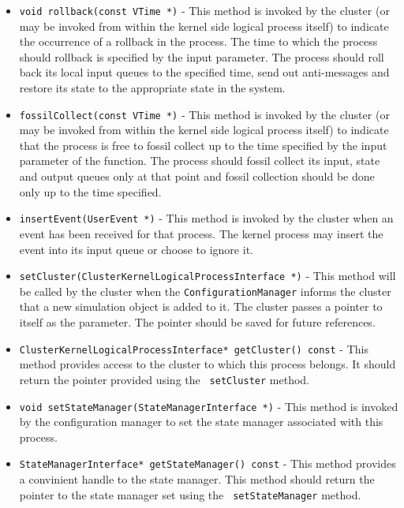 \begin{itemize}
\item {\tt void rollback(const VTime *)} - This method is invoked by the
  cluster (or may be invoked from within the kernel side logical process
  itself) to indicate the occurrence of a rollback in the process. The
  time to which the process should rollback is specified by the input
  parameter. The process should roll back its local input queues to the
  specified time, send out anti-messages and restore its state to the
  appropriate state in the system.
  
\item {\tt fossilCollect(const VTime *)} - This method is invoked by the
  cluster (or may be invoked from within the kernel side logical process
  itself) to indicate that the process is free to fossil collect up to the
  time specified by the input parameter of the function. The process
  should fossil collect its input, state and output queues only at that
  point and fossil collection should be done only up to the time
  specified.

\item {\tt insertEvent(UserEvent *)} - This method is invoked by the
  cluster when an event has been received for that process. The kernel
  process may insert the event into its input queue or choose to ignore it.

\item {\tt setCluster(ClusterKernelLogicalProcessInterface *)} - This
  method will be called by the cluster when the {\tt ConfigurationManager}
  informs the cluster that a new simulation object is added to it. The
  cluster passes a pointer to itself as the parameter. The pointer should
  be saved for future references. 

\item {\tt ClusterKernelLogicalProcessInterface* getCluster() const} -
  This method provides access to the cluster to which this process 
  belongs. It should return the pointer provided using the {\tt
  setCluster} method.

\item {\tt void setStateManager(StateManagerInterface *)} - This method is
  invoked by the configuration manager to set the state manager associated
  with this process.

\item {\tt StateManagerInterface* getStateManager() const} - This method
  provides a convinient handle to the state manager. This method should
  return the pointer to the state manager set using the {\tt
  setStateManager} method.


\end{itemize}
